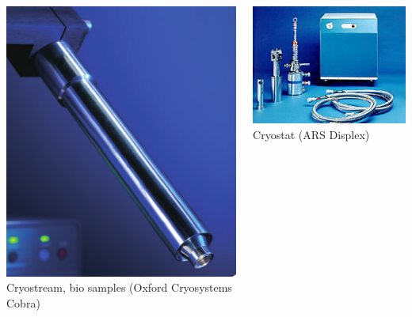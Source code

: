 \documentclass[10pt, xcolor=x11names, compress]{beamer}
\begin{document}
\begin{frame}
\begin{columns}[T]
\begin{column}{0.25\linewidth}
\begin{center}
        \includegraphics[width=0.63\linewidth]{exp/cryostream.png}\\
        Cryostream, bio samples {\tiny(Oxford Cryosystems Cobra)}
      \end{center}
    \end{column}
    \begin{column}{0.25\linewidth}
      \begin{center}
        \includegraphics[width=0.85\linewidth]{exp/displex.jpg}\\
        Cryostat {\tiny(ARS Displex)}

        \smallskip


\end{center}
\end{column}
\end{columns}
\end{frame}
\end{document}
